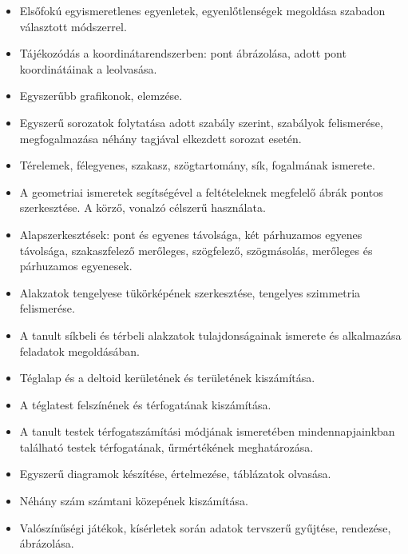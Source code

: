 \begin{itemize}
\item Elsőfokú egyismeretlenes egyenletek, egyenlőtlenségek megoldása szabadon választott módszerrel.
\item Tájékozódás a koordinátarendszerben: pont ábrázolása, adott pont koordinátáinak a leolvasása.
\item Egyszerűbb grafikonok, elemzése.
\item Egyszerű sorozatok folytatása adott szabály szerint, szabályok felismerése, megfogalmazása néhány tagjával elkezdett sorozat esetén.
\item Térelemek, félegyenes, szakasz, szögtartomány, sík, fogalmának ismerete.
\item A geometriai ismeretek segítségével a feltételeknek megfelelő ábrák pontos szerkesztése. A körző, vonalzó célszerű használata.
\item Alapszerkesztések: pont és egyenes távolsága, két párhuzamos egyenes távolsága, szakaszfelező merőleges, szögfelező, szögmásolás, merőleges és párhuzamos egyenesek.
\item Alakzatok tengelyese tükörképének szerkesztése, tengelyes szimmetria felismerése.
\item A tanult síkbeli és térbeli alakzatok tulajdonságainak ismerete és alkalmazása feladatok megoldásában.
\item Téglalap és a deltoid kerületének és területének kiszámítása.
\item A téglatest felszínének és térfogatának kiszámítása.
\item A tanult testek térfogatszámítási módjának ismeretében mindennapjainkban található testek térfogatának, űrmértékének meghatározása.
\item Egyszerű diagramok készítése, értelmezése, táblázatok olvasása.
\item Néhány szám számtani közepének kiszámítása.
\item Valószínűségi játékok, kísérletek során adatok tervszerű gyűjtése, rendezése, ábrázolása.
\end{itemize}
